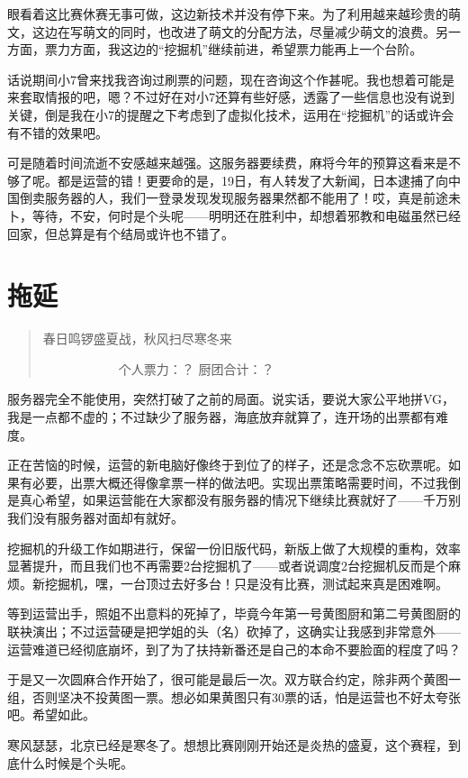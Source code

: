 眼看着这比赛休赛无事可做，这边新技术并没有停下来。为了利用越来越珍贵的萌文，这边在写萌文的同时，也改进了萌文的分配方法，尽量减少萌文的浪费。另一方面，票力方面，我这边的“挖掘机”继续前进，希望票力能再上一个台阶。

话说期间小7曾来找我咨询过刷票的问题，现在咨询这个作甚呢。我也想着可能是来套取情报的吧，嗯？不过好在对小7还算有些好感，透露了一些信息也没有说到关键，倒是我在小7的提醒之下考虑到了虚拟化技术，运用在“挖掘机”的话或许会有不错的效果吧。

可是随着时间流逝不安感越来越强。这服务器要续费，麻将今年的预算这看来是不够了呢。都是运营的错！更要命的是，19日，有人转发了大新闻，日本逮捕了向中国倒卖服务器的人，我们一登录发现发现服务器果然都不能用了！哎，真是前途未卜，等待，不安，何时是个头呢——明明还在胜利中，却想着邪教和电磁虽然已经回家，但总算是有个结局或许也不错了。


\section{拖延}
\begin{quote}
春日鸣锣盛夏战，秋风扫尽寒冬来

　　　　　　个人票力：？ 厨团合计：？
\end{quote}

服务器完全不能使用，突然打破了之前的局面。说实话，要说大家公平地拼VG，我是一点都不虚的；不过缺少了服务器，海底放弃就算了，连开场的出票都有难度。

正在苦恼的时候，运营的新电脑好像终于到位了的样子，还是念念不忘砍票呢。如果有必要，出票大概还得像拿票一样的做法吧。实现出票策略需要时间，不过我倒是真心希望，如果运营能在大家都没有服务器的情况下继续比赛就好了——千万别我们没有服务器对面却有就好。

挖掘机的升级工作如期进行，保留一份旧版代码，新版上做了大规模的重构，效率显著提升，而且我们也不再需要2台挖掘机了——或者说调度2台挖掘机反而是个麻烦。新挖掘机，嘿，一台顶过去好多台！只是没有比赛，测试起来真是困难啊。

等到运营出手，照姐不出意料的死掉了，毕竟今年第一号黄图厨和第二号黄图厨的联袂演出；不过运营硬是把学姐的头（名）砍掉了，这确实让我感到非常意外——运营难道已经彻底崩坏，到了为了扶持新番还是自己的本命不要脸面的程度了吗？

于是又一次圆麻合作开始了，很可能是最后一次。双方联合约定，除非两个黄图一组，否则坚决不投黄图一票。想必如果黄图只有30票的话，怕是运营也不好太夸张吧。希望如此。

寒风瑟瑟，北京已经是寒冬了。想想比赛刚刚开始还是炎热的盛夏，这个赛程，到底什么时候是个头呢。

